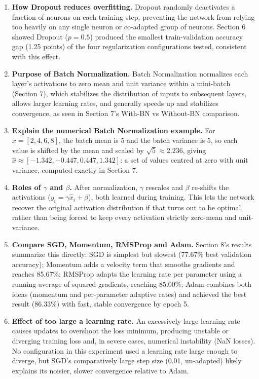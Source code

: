 \documentclass[10pt]{article}
\begin{document}
\begin{enumerate}
\item \textbf{How Dropout reduces overfitting.}
Dropout randomly deactivates a fraction of neurons on each training step,
preventing the network from relying too heavily on any single neuron or
co-adapted group of neurons. Section 6 showed Dropout ($p=0.5$) produced
the smallest train-validation accuracy gap (1.25 points) of the four
regularization configurations tested, consistent with this effect.

\item \textbf{Purpose of Batch Normalization.}
Batch Normalization normalizes each layer's activations to zero mean and
unit variance within a mini-batch (Section 7), which stabilizes the
distribution of inputs to subsequent layers, allows larger learning rates,
and generally speeds up and stabilizes convergence, as seen in Section 7's
With-BN vs Without-BN comparison.

\item \textbf{Explain the numerical Batch Normalization example.}
For $x = [2,4,6,8]$, the batch mean is 5 and the batch variance is 5, so
each value is shifted by the mean and scaled by $\sqrt{5} \approx 2.236$,
giving $\hat{x} \approx [-1.342, -0.447, 0.447, 1.342]$: a set of values
centred at zero with unit variance, computed exactly in Section 7.

\item \textbf{Roles of $\gamma$ and $\beta$.}
After normalization, $\gamma$ rescales and $\beta$ re-shifts the
activations ($y_i = \gamma \hat{x}_i + \beta$), both learned during
training. This lets the network recover the original activation
distribution if that turns out to be optimal, rather than being forced to
keep every activation strictly zero-mean and unit-variance.

\item \textbf{Compare SGD, Momentum, RMSProp and Adam.}
Section 8's results summarize this directly: SGD is simplest but slowest
(77.67\% best validation accuracy); Momentum adds a velocity term that
smooths gradients and reaches 85.67\%; RMSProp adapts the learning rate
per parameter using a running average of squared gradients, reaching
85.00\%; Adam combines both ideas (momentum and per-parameter adaptive
rates) and achieved the best result (86.33\%) with fast, stable
convergence by epoch 5.

\item \textbf{Effect of too large a learning rate.}
An excessively large learning rate causes updates to overshoot the loss
minimum, producing unstable or diverging training loss and, in severe
cases, numerical instability (NaN losses). No configuration in this
experiment used a learning rate large enough to diverge, but SGD's
comparatively large step size (0.01, un-adapted) likely explains its
noisier, slower convergence relative to Adam.


\end{enumerate}
\end{document}
